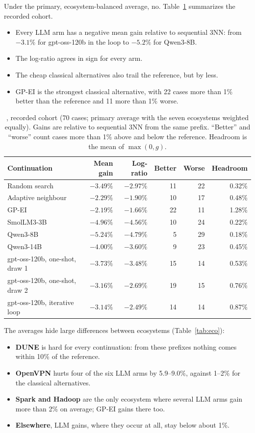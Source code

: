 Under the primary, ecosystem-balanced average, no. Table~\ref{tab:rq1} summarizes the recorded cohort.
\begin{itemize}
  \item Every LLM arm has a negative mean gain relative to sequential 3NN: from $-3.1\%$ for gpt-oss-120b in the loop to $-5.2\%$ for Qwen3-8B.
  \item The log-ratio agrees in sign for every arm.
  \item The cheap classical alternatives also trail the reference, but by less.
  \item GP-EI is the strongest classical alternative, with 22 cases more than 1\% better than the reference and 11 more than 1\% worse.
\end{itemize}

\begin{table}[t]
\centering
\caption{, recorded cohort (70 cases; primary average with the seven ecosystems weighted equally). Gains are relative to sequential 3NN from the same prefix. ``Better'' and ``worse'' count cases more than 1\% above and below the reference. Headroom is the mean of $\max(0,g)$.}
\label{tab:rq1}
\small
\begin{tabular}{lrrrrr}
\toprule
Continuation & Mean gain & Log-ratio & Better & Worse & Headroom \\
\midrule
Random search & $-3.49\%$ & $-2.97\%$ & 11 & 22 & 0.32\% \\
Adaptive neighbour & $-2.29\%$ & $-1.90\%$ & 10 & 17 & 0.48\% \\
GP-EI & $-2.19\%$ & $-1.66\%$ & 22 & 11 & 1.28\% \\
\midrule
SmolLM3-3B & $-4.96\%$ & $-4.56\%$ & 10 & 24 & 0.22\% \\
Qwen3-8B & $-5.24\%$ & $-4.79\%$ & 5 & 29 & 0.18\% \\
Qwen3-14B & $-4.00\%$ & $-3.60\%$ & 9 & 23 & 0.45\% \\
gpt-oss-120b, one-shot, draw 1 & $-3.73\%$ & $-3.48\%$ & 15 & 14 & 0.53\% \\
gpt-oss-120b, one-shot, draw 2 & $-3.16\%$ & $-2.69\%$ & 19 & 15 & 0.76\% \\
gpt-oss-120b, iterative loop & $-3.14\%$ & $-2.49\%$ & 14 & 14 & 0.87\% \\
\bottomrule
\end{tabular}
\end{table}

The averages hide large differences between ecosystems (Table~\ref{tab:eco}):
\begin{itemize}
  \item \textbf{DUNE} is hard for every continuation: from these prefixes nothing comes within 10\% of the reference.
  \item \textbf{OpenVPN} hurts four of the six LLM arms by 5.9--9.0\%, against 1--2\% for the classical alternatives.
  \item \textbf{Spark and Hadoop} are the only ecosystem where several LLM arms gain more than 2\% on average; GP-EI gains there too.
  \item \textbf{Elsewhere}, LLM gains, where they occur at all, stay below about 1\%.
\end{itemize}

